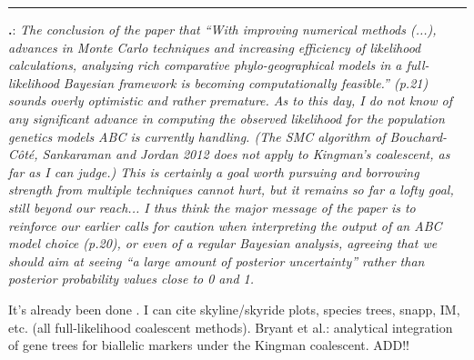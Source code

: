 \documentclass[12pt]{article}
\newcounter{commentCounter}
\newcommand{\revcomment}[1]{{\addtocounter{commentCounter}{1}}
    \medskip \hrule \noindent
\textbf{\arabic{section}.\arabic{commentCounter}}: {\sl #1}\par\xspace}
\newcommand{\response}[1]{{\addtolength{\leftskip}{0.25in} #1\par}\xspace}
\begin{document}
\revcomment{
    The conclusion of the paper that ``With improving numerical methods (...),
    advances in Monte Carlo techniques and increasing efficiency of likelihood
    calculations, analyzing rich comparative phylo-geographical models in a
    full-likelihood Bayesian framework is becoming computationally feasible.''
    (p.21) sounds overly optimistic and rather premature. As to this day, I do
    not know of any significant advance in computing the observed likelihood
    for the population genetics models ABC is currently handling. (The SMC
    algorithm of Bouchard-Côté, Sankaraman and Jordan 2012 does not apply to
    Kingman's coalescent, as far as I can judge.) This is certainly a goal
    worth pursuing and borrowing strength from multiple techniques cannot hurt,
    but it remains so far a lofty goal, still beyond our reach... I thus think
    the major message of the paper is to reinforce our earlier calls for
    caution when interpreting the output of an ABC model choice (p.20), or even
    of a regular Bayesian analysis, agreeing that we should aim at seeing ``a
    large amount of posterior uncertainty'' rather than posterior probability
    values close to 0 and 1.
}
\response{
    It's already been done \cite{JeetDiss}.
    I can cite skyline/skyride plots, species trees, snapp, IM, etc. (all
    full-likelihood coalescent methods).
    Bryant et al.: analytical integration of gene trees for biallelic markers
    under the Kingman coalescent.
    ADD!!
}



\end{document}
